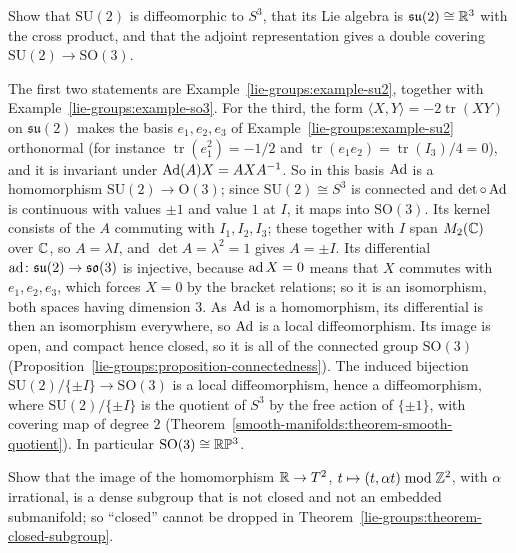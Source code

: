 \begin{exercise}\label{lie-groups:exercise-su2}
Show that $\mathrm{SU}(2)$ is diffeomorphic to $S^3$, that its Lie algebra is $\mathfrak{su}(2) \cong \mathbb{R}^3$ with the cross product, and that the adjoint representation gives a double covering
$\mathrm{SU}(2) \to \mathrm{SO}(3)$.
\end{exercise}

\begin{solution}
The first two statements are Example~\ref{lie-groups:example-su2}, together with Example~\ref{lie-groups:example-so3}. For the third, the form
$\langle X, Y\rangle = -2\operatorname{tr}(XY)$ on $\mathfrak{su}(2)$ makes the basis $e_1, e_2, e_3$ of Example~\ref{lie-groups:example-su2} orthonormal
(for instance $\operatorname{tr}(e_1^2) = -1/2$ and $\operatorname{tr}(e_1e_2) = \operatorname{tr}(I_3)/4 = 0$), and it is invariant under
$\operatorname{Ad}(A)X = AXA^{-1}$. So in this basis $\operatorname{Ad}$ is a homomorphism $\mathrm{SU}(2) \to \mathrm{O}(3)$; since $\mathrm{SU}(2) \cong S^3$ is connected and
$\det \circ \operatorname{Ad}$ is continuous with values $\pm 1$ and value $1$ at $I$, it maps into $\mathrm{SO}(3)$. Its kernel consists of the $A$ commuting with
$I_1, I_2, I_3$; these together with $I$ span $M_2(\mathbb{C})$ over $\mathbb{C}$, so $A = \lambda I$, and $\det A = \lambda^2 = 1$ gives $A = \pm I$. Its differential
$\operatorname{ad} \colon \mathfrak{su}(2) \to \mathfrak{so}(3)$ is injective, because $\operatorname{ad} X = 0$ means that $X$ commutes with $e_1, e_2, e_3$, which forces $X = 0$ by the
bracket relations; so it is an isomorphism, both spaces having dimension $3$. As $\operatorname{Ad}$ is a homomorphism, its differential is then an isomorphism everywhere,
so $\operatorname{Ad}$ is a local diffeomorphism. Its image is open, and compact hence closed, so it is all of the connected group $\mathrm{SO}(3)$
(Proposition~\ref{lie-groups:proposition-connectedness}). The induced bijection $\mathrm{SU}(2)/\{\pm I\} \to \mathrm{SO}(3)$ is a local diffeomorphism, hence a
diffeomorphism, where $\mathrm{SU}(2)/\{\pm I\}$ is the quotient of $S^3$ by the free action of $\{\pm 1\}$, with covering map of degree $2$
(Theorem~\ref{smooth-manifolds:theorem-smooth-quotient}). In particular $\mathrm{SO}(3) \cong \mathbb{R}\mathbb{P}^3$.
\end{solution}

\begin{exercise}\label{lie-groups:exercise-closed-subgroup-needed}
Show that the image of the homomorphism $\mathbb{R} \to T^2$, $t \mapsto (t, \alpha t) \bmod \mathbb{Z}^2$, with $\alpha$ irrational, is a dense subgroup that is not closed and not an embedded submanifold; so
``closed'' cannot be dropped in Theorem~\ref{lie-groups:theorem-closed-subgroup}.
\end{exercise}

